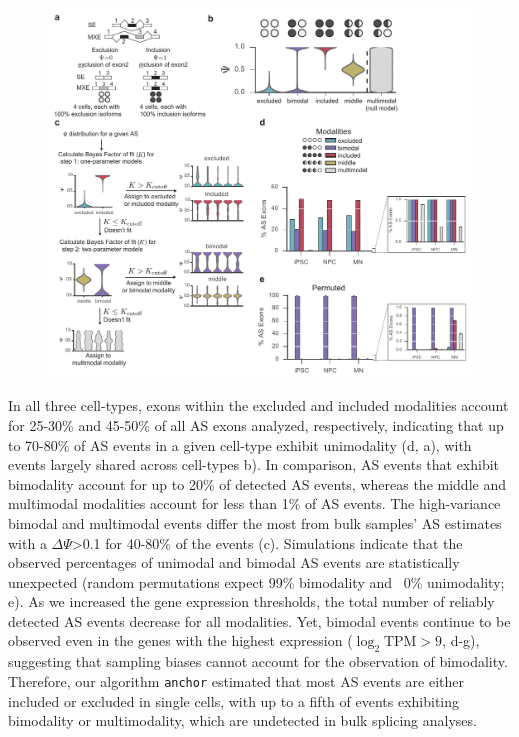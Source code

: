 \clearpage
\begin{figure}[h]
\ContinuedFloat
\captionsetup{labelformat=empty}
\centering
\includegraphics[width=5.8in]{figures/anchor_overview.pdf}
\end{figure}
\clearpage


In all three cell-types, exons within the excluded and included modalities account for 25-30\% and 45-50\% of all AS exons analyzed, respectively, indicating that up to 70-80\% of AS events in a given cell-type exhibit unimodality (d, a), with events largely shared across cell-types b). In comparison, AS events that exhibit bimodality account for up to 20\% of detected AS events, whereas the middle and multimodal modalities account for less than 1\% of AS events. The high-variance bimodal and multimodal events differ the most from bulk samples' AS estimates with a $\Delta\Psi$>0.1 for 40-80\% of the events (c). Simulations indicate that the observed percentages of unimodal and bimodal AS events are statistically unexpected (random permutations expect 99\% bimodality and ~0\% unimodality; e). As we increased the gene expression thresholds, the total number of reliably detected AS events decrease for all modalities. Yet, bimodal events continue to be observed even in the genes with the highest expression ($\log_2 \text{TPM} > 9$, d-g), suggesting that sampling biases cannot account for the observation of bimodality. Therefore, our algorithm \texttt{anchor} estimated that most AS events are either included or excluded in single cells, with up to a fifth of events exhibiting bimodality or multimodality, which are undetected in bulk splicing analyses. 




